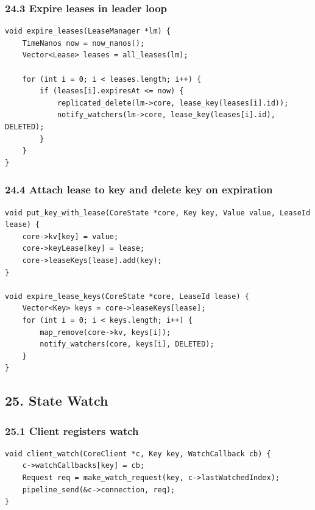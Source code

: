 \documentclass[10pt,letterpaper]{article}
\begin{document}
\subsubsection*{24.3 Expire leases in leader loop}

\begin{verbatim}
void expire_leases(LeaseManager *lm) {
    TimeNanos now = now_nanos();
    Vector<Lease> leases = all_leases(lm);

    for (int i = 0; i < leases.length; i++) {
        if (leases[i].expiresAt <= now) {
            replicated_delete(lm->core, lease_key(leases[i].id));
            notify_watchers(lm->core, lease_key(leases[i].id), DELETED);
        }
    }
}
\end{verbatim}

\subsubsection*{24.4 Attach lease to key and delete key on expiration}

\begin{verbatim}
void put_key_with_lease(CoreState *core, Key key, Value value, LeaseId lease) {
    core->kv[key] = value;
    core->keyLease[key] = lease;
    core->leaseKeys[lease].add(key);
}

void expire_lease_keys(CoreState *core, LeaseId lease) {
    Vector<Key> keys = core->leaseKeys[lease];
    for (int i = 0; i < keys.length; i++) {
        map_remove(core->kv, keys[i]);
        notify_watchers(core, keys[i], DELETED);
    }
}
\end{verbatim}

\subsection*{25. State Watch}

\subsubsection*{25.1 Client registers watch}

\begin{verbatim}
void client_watch(CoreClient *c, Key key, WatchCallback cb) {
    c->watchCallbacks[key] = cb;
    Request req = make_watch_request(key, c->lastWatchedIndex);
    pipeline_send(&c->connection, req);
}
\end{verbatim}
\end{document}
